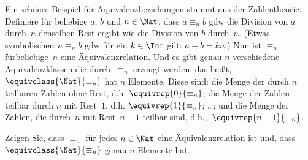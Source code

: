 \documentclass[../../../include/open-logic-section]{subfiles}
\begin{document}
\begin{ex}
Ein schönes Beispiel für Äquivalenzbeziehungen stammt aus der Zahlentheorie.
Definiere für beliebige $a$, $b$ und $n \in \Nat$, dass $a \equiv_n b$ gdw
die Division von $a$ durch~$n$ denselben Rest ergibt wie die Division von $b$ durch~$n$.
(Etwas symbolischer: $a \equiv_n b$ gdw für ein $k \in
\Int$ gilt: $a - b = kn$.) Nun ist $\equiv_n$ fürbeliebige~$n$ eine Äquivalenzrelation.
Und es gibt genau $n$ verschiedene Äquivalenzklassen
die durch~$\equiv_n$ erzeugt werden; das heißt, $\equivclass{\Nat}{\equiv_n}$ hat
$n$ Elemente. Diese sind: die Menge der durch $n$ teilbaren Zahlen
ohne Rest, d.h. $\equivrep{0}{\equiv_n}$; die Menge der Zahlen
teilbar durch $n$ mit Rest~$1$, d.h. $\equivrep{1}{\equiv_n}$;
\ldots; und die Menge der Zahlen, die durch~$n$ mit Rest~$n-1$ teilbar sind,
d.h.,~$\equivrep{n-1}{\equiv_n}$.
\end{ex}

\begin{prob}
Zeigen Sie, dass $\equiv_n$ für jedes $n \in
\Nat$ eine Äquivalenzrelation ist und, dass $\equivclass{\Nat}{\equiv_n}$
genau $n$ Elemente hat.
\end{prob}
\end{document}
